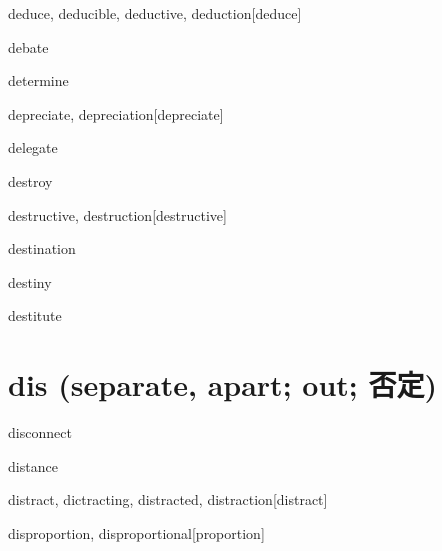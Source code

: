 \begin{RefWord}{deduce, deducible, deductive, deduction}[deduce]
\end{RefWord}

\begin{RefWord}{debate}
\end{RefWord}

\begin{RefWord}{determine}
\end{RefWord}

\begin{RefWord}{depreciate, depreciation}[depreciate]
\end{RefWord}

\begin{RefWord}{delegate}
\end{RefWord}

\begin{RefWord}{destroy}
\end{RefWord}

\begin{RefWord}{destructive, destruction}[destructive]
\end{RefWord}

\begin{RefWord}{destination}
\end{RefWord}

\begin{RefWord}{destiny}
\end{RefWord}

\begin{RefWord}{destitute}
\end{RefWord}

\section{dis (separate, apart; out; 否定)}

\begin{RefWord}{disconnect}
\end{RefWord}

\begin{RefWord}{distance}
\end{RefWord}

\begin{RefWord}{distract, dictracting, distracted, distraction}[distract]
\end{RefWord}

\begin{RefWord}{disproportion, disproportional}[proportion]
\end{RefWord}


